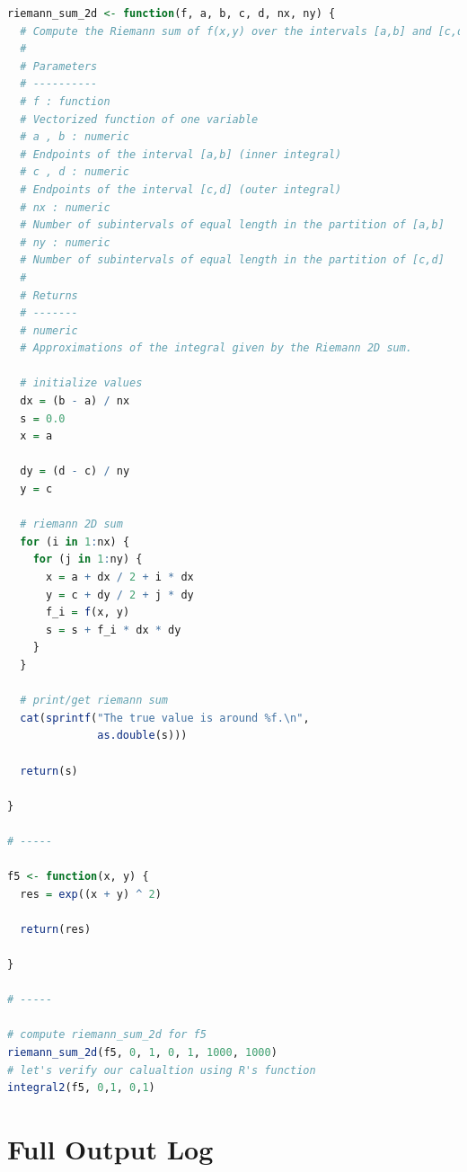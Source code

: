 \documentclass[11pt,a4paper]{article}
\begin{document}
\begin{lstlisting}[frame=trBL, language=R]
riemann_sum_2d <- function(f, a, b, c, d, nx, ny) {
  # Compute the Riemann sum of f(x,y) over the intervals [a,b] and [c,d].
  #
  # Parameters
  # ----------
  # f : function
  # Vectorized function of one variable
  # a , b : numeric
  # Endpoints of the interval [a,b] (inner integral)
  # c , d : numeric
  # Endpoints of the interval [c,d] (outer integral)
  # nx : numeric
  # Number of subintervals of equal length in the partition of [a,b]
  # ny : numeric
  # Number of subintervals of equal length in the partition of [c,d]
  #
  # Returns
  # -------
  # numeric
  # Approximations of the integral given by the Riemann 2D sum.
  
  # initialize values
  dx = (b - a) / nx
  s = 0.0
  x = a
  
  dy = (d - c) / ny
  y = c
  
  # riemann 2D sum
  for (i in 1:nx) {
    for (j in 1:ny) {
      x = a + dx / 2 + i * dx
      y = c + dy / 2 + j * dy
      f_i = f(x, y)
      s = s + f_i * dx * dy
    }
  }
  
  # print/get riemann sum
  cat(sprintf("The true value is around %f.\n",
              as.double(s)))
  
  return(s)
  
}

# -----

f5 <- function(x, y) {
  res = exp((x + y) ^ 2)
  
  return(res)
  
}

# -----

# compute riemann_sum_2d for f5
riemann_sum_2d(f5, 0, 1, 0, 1, 1000, 1000)
# let's verify our calualtion using R's function
integral2(f5, 0,1, 0,1)

\end{lstlisting}

\clearpage

\section{Full Output Log}\label{sec:fullLog}
\end{document}
